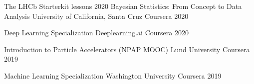 

\begin{cvhonors}

            \cvhonor
            {The LHCb Starterkit lessons} %
        {} %
    {} %
    {2020} %
            \cvhonor
            {Bayesian Statistics: From Concept to Data Analysis} %
        {University of California, Santa Cruz Coursera} %
    {} %
    {2020} %


            \cvhonor
        {Deep Learning Specialization} %
        {Deeplearning.ai Coursera} %
    {} %
    {2020} %
    
     \cvhonor
        {Introduction to Particle Accelerators (NPAP MOOC)} %
  {Lund University Coursera} %
    {} %
    {2019} %
    
     \cvhonor
        {Machine Learning Specialization} %
  {Washington University Coursera} %
    {} %
    {2019} %
  

\end{cvhonors}
